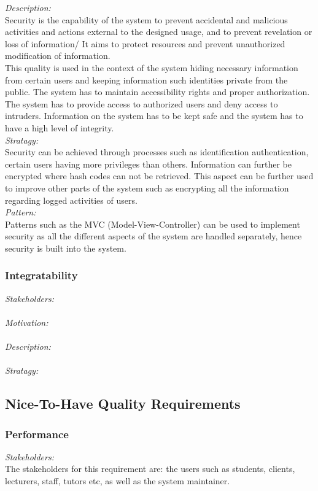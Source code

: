 \documentclass[a4paper,12pt]{report}
\begin{document}
		\emph{Description: }\\ Security is the capability of the system to prevent accidental  and malicious activities and actions external to the designed usage, and to prevent revelation or loss of information/ It aims to protect resources and prevent unauthorized modification of information.\\
		This quality is used in the context of the system hiding necessary information from certain users and keeping information such identities private from the public. The system has to maintain accessibility rights and proper authorization. The system has to provide access to authorized users and deny access to intruders. Information on the system has to be kept safe and the system has to have a high level of integrity.\\
		
		\emph{Stratagy: }\\ Security can be achieved through processes such as identification authentication, certain users having more privileges than others. Information can further be encrypted where hash codes can not be retrieved. This aspect can be further used to improve other parts of the system such as encrypting all the information regarding logged activities of users.\\
		
		\emph{Pattern: } \\ Patterns such as the MVC (Model-View-Controller) can be used to implement security as all the different aspects of the system are handled separately, hence security is built into the system.\\
			
			
		\subsubsection{Integratability}
		\emph{Stakeholders: }\\
		\\\emph{Motivation: }\\
		\\\emph{Description: }\\
		\\\emph{Stratagy: }\\
		
	\subsection{Nice-To-Have Quality Requirements}
		\subsubsection{Performance}
		\emph{Stakeholders: }\\ The stakeholders for this requirement are: the users such as students, clients, lecturers, staff, tutors etc, as well as the system maintainer.\\
		
\end{document}
